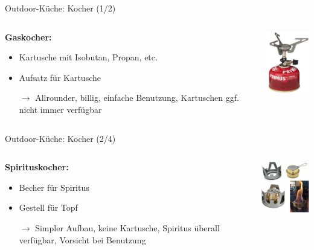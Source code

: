 \documentclass[aspectratio=169]{beamer}
\newcommand{\sarrow}{\small$\rightarrow$}
\begin{document}
			\begin{frame}{Outdoor-Küche: Kocher (1/2)}
				\begin{columns}[c]
					\begin{column}{0.69\textwidth}
						\textbf{Gaskocher:}
						\begin{itemize}
							\item Kartusche mit Isobutan, Propan, etc.
							\item Aufsatz für Kartusche
							\item[\sarrow] Allrounder, billig, einfache Benutzung, Kartuschen ggf. nicht immer verfügbar
						\end{itemize}
					\end{column}
					\begin{column}{0.29\textwidth}
						\includegraphics[width=2.5cm]{images/kocher-gas.png}
					\end{column}
				\end{columns}
			\end{frame}
				
			\begin{frame}{Outdoor-Küche: Kocher (2/4)}
				\begin{columns}[c]
					\begin{column}{0.69\textwidth}
						\textbf{Spirituskocher:}
						\begin{itemize}
							\item Becher für Spiritus
							\item Gestell für Topf
							\item[\sarrow] Simpler Aufbau, keine Kartusche, Spiritus überall verfügbar, Vorsicht bei Benutzung
						\end{itemize}
					\end{column}
					\begin{column}{0.29\textwidth}
						\includegraphics[width=3cm]{images/kocher-spiritus.png}
					\end{column}
				\end{columns}
			\end{frame}
		
\end{document}
